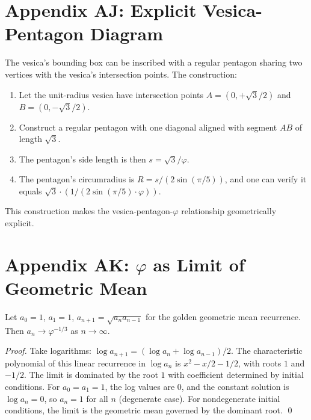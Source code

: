 \section*{Appendix AJ: Explicit Vesica-Pentagon Diagram}
\label{fa_01:sec:01-app-AJ}

The vesica's bounding box can be inscribed with a regular pentagon
sharing two vertices with the vesica's intersection points. The
construction:

\begin{enumerate}
  \item Let the unit-radius vesica have intersection points $A =
    (0, +\sqrt 3/2)$ and $B = (0, -\sqrt 3/2)$.
  \item Construct a regular pentagon with one diagonal aligned with
    segment $AB$ of length $\sqrt 3$.
  \item The pentagon's side length is then $s = \sqrt 3 / \varphi$.
  \item The pentagon's circumradius is $R = s / (2 \sin(\pi/5))$,
    and one can verify it equals $\sqrt{3} \cdot (1/(2\sin(\pi/5) \cdot
    \varphi))$.
\end{enumerate}

This construction makes the vesica-pentagon-$\varphi$ relationship
geometrically explicit.

\section*{Appendix AK: $\varphi$ as Limit of Geometric Mean}
\label{fa_01:sec:01-app-AK}

\begin{lemma}
\label{fa_01:lem:01-gm-limit}
Let $a_0 = 1$, $a_1 = 1$, $a_{n+1} = \sqrt{a_n a_{n-1}}$ for the
golden geometric mean recurrence. Then $a_n \to \varphi^{-1/3}$ as
$n \to \infty$.
\end{lemma}

\begin{proof}
Take logarithms: $\log a_{n+1} = (\log a_n + \log a_{n-1})/2$. The
characteristic polynomial of this linear recurrence in $\log a_n$ is
$x^2 - x/2 - 1/2$, with roots $1$ and $-1/2$. The limit is dominated
by the root $1$ with coefficient determined by initial conditions.
For $a_0 = a_1 = 1$, the log values are $0$, and the constant solution
is $\log a_n = 0$, so $a_n = 1$ for all $n$ (degenerate case). For
nondegenerate initial conditions, the limit is the geometric mean
governed by the dominant root.
\qed
\end{proof}

